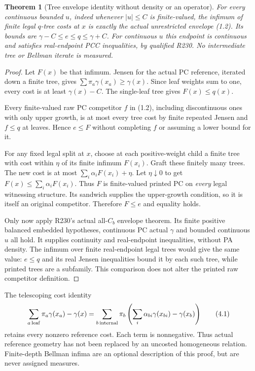 \documentclass[11pt]{article}
\newtheorem{theorem}{Theorem}[section]
\begin{document}
\begin{theorem}[Tree envelope identity without density or an operator]\label{t:tree}
For every continuous bounded $u$, indeed whenever $|u|\leq C$ is finite-valued, the infimum of finite legal $q$-tree costs at $x$ is exactly the actual unrestricted envelope (1.2). Its bounds are $\gamma-C\leq e\leq q\leq\gamma+C$. For continuous $u$ this endpoint is continuous and satisfies real-endpoint PCC inequalities, by qualified R230. No intermediate tree or Bellman iterate is measured.
\end{theorem}
\begin{proof}
Let $F(x)$ be that infimum. Jensen for the actual PC reference, iterated down a finite tree, gives $\sum\pi_a\gamma(x_a)\geq\gamma(x)$. Since leaf weights sum to one, every cost is at least $\gamma(x)-C$. The single-leaf tree gives $F(x)\leq q(x)$.

Every finite-valued raw PC competitor $f$ in (1.2), including discontinuous ones with only upper growth, is at most every tree cost by finite repeated Jensen and $f\leq q$ at leaves. Hence $e\leq F$ without completing $f$ or assuming a lower bound for it.

For any fixed legal split at $x$, choose at each positive-weight child a finite tree with cost within $\eta$ of its finite infimum $F(x_i)$. Graft these finitely many trees. The new cost is at most $\sum_i\alpha_i F(x_i)+\eta$. Let $\eta\downarrow0$ to get $F(x)\leq\sum_i\alpha_i F(x_i)$. Thus $F$ is finite-valued printed PC on \emph{every} legal witnessing structure. Its sandwich supplies the upper-growth condition, so it is itself an original competitor. Therefore $F\leq e$ and equality holds.

Only now apply R230's actual all-$C_b$ envelope theorem. Its finite positive balanced embedded hypotheses, continuous PC actual $\gamma$ and bounded continuous $u$ all hold. It supplies continuity and real-endpoint inequalities, without PA density. The infimum over finite real-endpoint legal trees would give the same value: $e\leq q$ and its real Jensen inequalities bound it by each such tree, while printed trees are a subfamily. This comparison does not alter the printed raw competitor definition.
\end{proof}

The telescoping cost identity
\[
 \sum_{a\,\rm leaf}\pi_a\gamma(x_a)-\gamma(x)
 =\sum_{b\,\rm internal}\pi_b
       \left(\sum_i\alpha_{bi}\gamma(x_{bi})-\gamma(x_b)\right)         \tag{4.1}
\]
retains every nonzero reference cost. Each term is nonnegative. Thus actual reference geometry has not been replaced by an uncosted homogeneous relation. Finite-depth Bellman infima are an optional description of this proof, but are never assigned measures.
\end{document}

